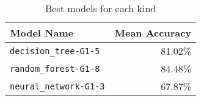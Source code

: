 \begin{table}[H]
\centering
\begin{tabularx}{0.48\textwidth}{|X|r|}
\hline
Model Name & Mean Accuracy \\
\hline
\texttt{decision\_tree-G1-5} & 81.02\% \\
\texttt{random\_forest-G1-8} & 84.48\% \\
\texttt{neural\_network-G1-3} & 67.87\% \\
\hline
\end{tabularx}
\caption{Best models for each kind}
\label{tab:best_model_per_kind}

\end{table}
